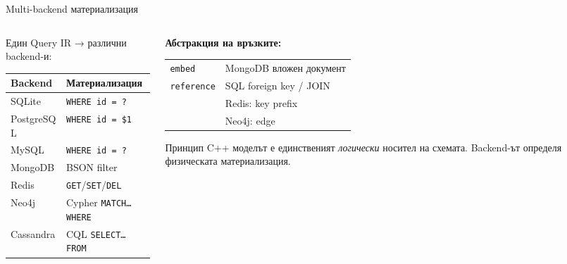 \documentclass[aspectratio=169,12pt]{beamer}
\begin{document}
\begin{frame}{Multi-backend материализация}
    \begin{columns}[T]
        \begin{column}{0.50\textwidth}
            {\small Един Query IR → различни backend-и:}
            \begin{tabularx}{\linewidth}{@{}lX@{}}
                \toprule
                \textbf{Backend}  & \textbf{Материализация}\\
                \midrule
                SQLite      & \texttt{WHERE id = ?}\\
                PostgreSQL  & \texttt{WHERE id = \$1}\\
                MySQL       & \texttt{WHERE id = ?}\\
                \midrule
                MongoDB     & BSON filter\\
                Redis       & \texttt{GET}/\texttt{SET}/\texttt{DEL}\\
                Neo4j       & Cypher \texttt{MATCH…WHERE}\\
                Cassandra   & CQL \texttt{SELECT…FROM}\\
                \bottomrule
            \end{tabularx}
        \end{column}
        \begin{column}{0.47\textwidth}
            \textbf{Абстракция на връзките:}\\[0.1em]
            \begin{tabularx}{\linewidth}{@{}lX@{}}
                \texttt{embed}     & MongoDB вложен документ\\
                \texttt{reference} & SQL foreign key / JOIN\\
                                   & Redis: key prefix\\
                                   & Neo4j: edge\\
            \end{tabularx}
            \vspace{0.1em}
            \begin{alertblock}{Принцип}
                {\small C++ моделът е единственият
                \emph{логически} носител на схемата.
                Backend-ът определя физическата
                материализация.}
            \end{alertblock}
        \end{column}
    \end{columns}
\end{frame}
\end{document}
